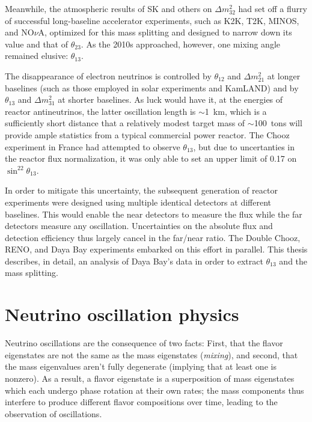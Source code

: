 \documentclass[../thesis.tex]{subfiles}
\begin{document}
Meanwhile, the atmospheric results of SK and others on \(\Delta m^2_{32}\) had set off a flurry of successful long-baseline accelerator experiments, such as K2K, T2K, MINOS, and NO$\nu$A, optimized for this mass splitting and designed to narrow down its value and that of $\theta_{23}$. As the 2010s approached, however, one mixing angle remained elusive: $\theta_{13}$.

The disappearance of electron neutrinos is controlled by $\theta_{12}$ and \(\Delta m^2_{21}\) at longer baselines (such as those employed in solar experiments and KamLAND) and by $\theta_{13}$ and \(\Delta m^2_{31}\) at shorter baselines. As luck would have it, at the energies of reactor antineutrinos, the latter oscillation length is $\sim$1~km, which is a sufficiently short distance that a relatively modest target mass of $\sim$100~tons will provide ample statistics from a typical commercial power reactor. The Chooz experiment in France had attempted to observe $\theta_{13}$, but due to uncertanties in the reactor flux normalization, it was only able to set an upper limit of 0.17 on \(\sin^22\theta_{13}\).

In order to mitigate this uncertainty, the subsequent generation of reactor experiments were designed using multiple identical detectors at different baselines. This would enable the near detectors to measure the flux while the far detectors measure any oscillation. Uncertainties on the absolute flux and detection efficiency thus largely cancel in the far/near ratio. The Double Chooz, RENO, and Daya Bay experiments embarked on this effort in parallel. This thesis describes, in detail, an analysis of Daya Bay's data in order to extract $\theta_{13}$ and the mass splitting.

\section{Neutrino oscillation physics}
\label{sec:oscPhysics}

Neutrino oscillations are the consequence of two facts: First, that the flavor eigenstates are not the same as the mass eigenstates (\emph{mixing}), and second, that the mass eigenvalues aren't fully degenerate (implying that at least one is nonzero). As a result, a flavor eigenstate is a superposition of mass eigenstates which each undergo phase rotation at their own rates; the mass components thus interfere to produce different flavor compositions over time, leading to the observation of oscillations.
\end{document}
